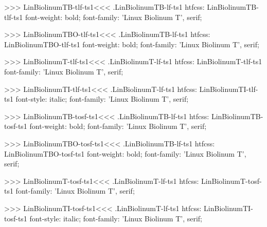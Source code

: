 {{{{{{{>>>
\<LinBiolinumTB-tlf-ts1\><<<
.LinBiolinumTB-lf-ts1
htfcss:  LinBiolinumTB-tlf-ts1  font-weight: bold; font-family: 'Linux Biolinum T', serif;

>>>
\<LinBiolinumTBO-tlf-ts1\><<<
.LinBiolinumTB-lf-ts1
htfcss:  LinBiolinumTBO-tlf-ts1  font-weight: bold; font-family: 'Linux Biolinum T', serif;

>>>
\<LinBiolinumT-tlf-ts1\><<<
.LinBiolinumT-lf-ts1
htfcss:  LinBiolinumT-tlf-ts1  font-family: 'Linux Biolinum T', serif;

>>>
\<LinBiolinumTI-tlf-ts1\><<<
.LinBiolinumT-lf-ts1
htfcss:  LinBiolinumTI-tlf-ts1  font-style: italic; font-family: 'Linux Biolinum T', serif;

>>>
\<LinBiolinumTB-tosf-ts1\><<<
.LinBiolinumTB-lf-ts1
htfcss:  LinBiolinumTB-tosf-ts1  font-weight: bold; font-family: 'Linux Biolinum T', serif;

>>>
\<LinBiolinumTBO-tosf-ts1\><<<
.LinBiolinumTB-lf-ts1
htfcss:  LinBiolinumTBO-tosf-ts1  font-weight: bold; font-family: 'Linux Biolinum T', serif;

>>>
\<LinBiolinumT-tosf-ts1\><<<
.LinBiolinumT-lf-ts1
htfcss:  LinBiolinumT-tosf-ts1  font-family: 'Linux Biolinum T', serif;

>>>
\<LinBiolinumTI-tosf-ts1\><<<
.LinBiolinumT-lf-ts1
htfcss:  LinBiolinumTI-tosf-ts1  font-style: italic; font-family: 'Linux Biolinum T', serif;

}}}}}}}
